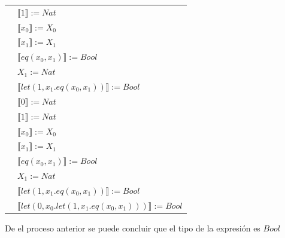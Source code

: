 \begin{exercise}
\begin{description}
\begin{center}
\begin{longtable}{ | l | l | }
                        & $ \llbracket 1 \rrbracket := Nat$ \\
                        & $ \llbracket x_0 \rrbracket := X_0$ \\
                        & $ \llbracket x_1 \rrbracket := X_1$ \\
                        & $ \llbracket eq(x_0,x_1) \rrbracket := Bool$ \\
                        & $X_1 := Nat$ \\
                        & $ \llbracket let(1,x_1.eq(x_0,x_1)) \rrbracket := Bool$ \\
                      \hline
                        & $ \llbracket 0 \rrbracket := Nat$ \\
                        & $ \llbracket 1 \rrbracket := Nat$  \\
                        & $ \llbracket x_0 \rrbracket := X_0$ \\
                        & $ \llbracket x_1 \rrbracket := X_1$ \\
                        & $ \llbracket eq(x_0,x_1) \rrbracket := Bool$ \\
                        & $X_1 := Nat$ \\
                        & $ \llbracket let(1,x_1.eq(x_0,x_1)) \rrbracket := Bool$ \\
                        & $ \llbracket let(0,x_0.let(1,x_1.eq(x_0,x_1))) \rrbracket := Bool$ \\
		\hline
                    \end{longtable}
                \end{center}
        De el proceso anterior se puede concluir que el tipo de la expresión es $Bool$
        \end{description}
    \end{exercise}


